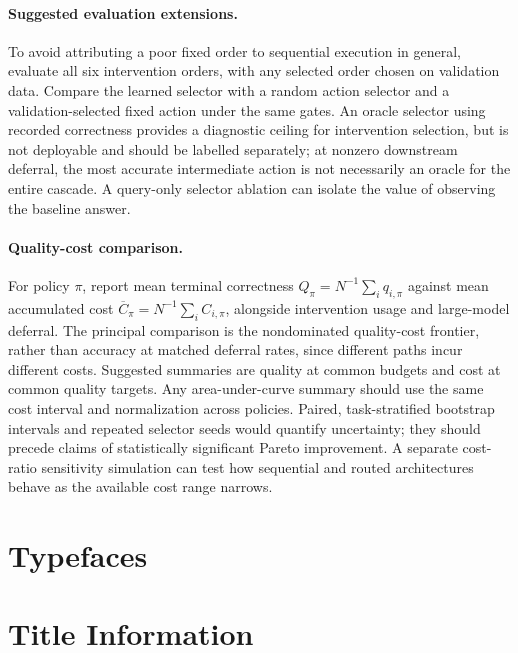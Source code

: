 \documentclass[sigconf]{acmart}
\begin{document}
\paragraph{Suggested evaluation extensions.}
To avoid attributing a poor fixed order to sequential execution in general, evaluate all six intervention orders, with any selected order chosen on validation data. Compare the learned selector with a random action selector and a validation-selected fixed action under the same gates. An oracle selector using recorded correctness provides a diagnostic ceiling for intervention selection, but is not deployable and should be labelled separately; at nonzero downstream deferral, the most accurate intermediate action is not necessarily an oracle for the entire cascade. A query-only selector ablation can isolate the value of observing the baseline answer.

\paragraph{Quality-cost comparison.}
For policy $\pi$, report mean terminal correctness $Q_\pi=N^{-1}\sum_i q_{i,\pi}$ against mean accumulated cost $\overline C_\pi=N^{-1}\sum_i C_{i,\pi}$, alongside intervention usage and large-model deferral. The principal comparison is the nondominated quality-cost frontier, rather than accuracy at matched deferral rates, since different paths incur different costs. Suggested summaries are quality at common budgets and cost at common quality targets. Any area-under-curve summary should use the same cost interval and normalization across policies. Paired, task-stratified bootstrap intervals and repeated selector seeds would quantify uncertainty; they should precede claims of statistically significant Pareto improvement. A separate cost-ratio sensitivity simulation can test how sequential and routed architectures behave as the available cost range narrows.





\section{Typefaces}



\section{Title Information}
\end{document}
